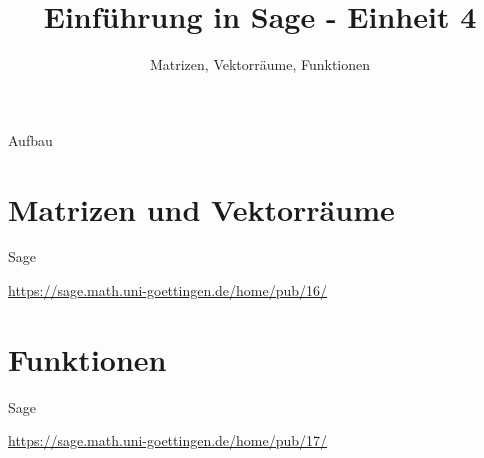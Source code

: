 \documentclass[hyperref={xetex}]{beamer}
\title{Einführung in Sage - Einheit 4}
\subtitle{Matrizen, Vektorräume, Funktionen}
\begin{document}
\titlepage

\begin{frame}{Aufbau}
\tableofcontents
\end{frame}


\section{Matrizen und Vektorräume}

\begin{frame}{Sage}
\begin{center}
\url{https://sage.math.uni-goettingen.de/home/pub/16/}
\end{center}
\end{frame}

\section{Funktionen}

\begin{frame}{Sage}
\begin{center}
\url{https://sage.math.uni-goettingen.de/home/pub/17/}
\end{center}
\end{frame}
\end{document}
